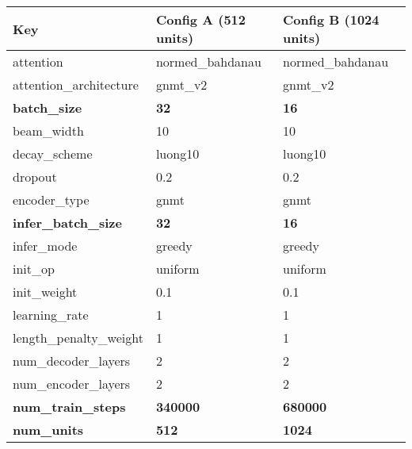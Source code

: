 \begin{table}[]
\small
\centering
\begin{tabular}{|l|l|l|}
\hline
\textbf{Key}                & \textbf{Config A (512 units)} & \textbf{Config B (1024 units)} \\ \hline
attention                   & normed\_bahdanau              & normed\_bahdanau               \\ \hline
attention\_architecture     & gnmt\_v2                      & gnmt\_v2                       \\ \hline
\textbf{batch\_size}        & \textbf{32}                   & \textbf{16}                    \\ \hline
beam\_width                 & 10                            & 10                             \\ \hline
decay\_scheme               & luong10                       & luong10                        \\ \hline
dropout                     & 0.2                           & 0.2                            \\ \hline
encoder\_type               & gnmt                          & gnmt                           \\ \hline
\textbf{infer\_batch\_size} & \textbf{32}                   & \textbf{16}                    \\ \hline
infer\_mode                 & greedy                        & greedy                         \\ \hline
init\_op                    & uniform                       & uniform                        \\ \hline
init\_weight                & 0.1                           & 0.1                            \\ \hline
learning\_rate              & 1                             & 1                              \\ \hline
length\_penalty\_weight     & 1                             & 1                              \\ \hline
num\_decoder\_layers        & 2                             & 2                              \\ \hline
num\_encoder\_layers        & 2                             & 2                              \\ \hline
\textbf{num\_train\_steps}         & \textbf{340000}                  & \textbf{680000} 
 \\ \hline
\textbf{num\_units}         & \textbf{512}                  & \textbf{1024} 

\end{tabular}
\end{table}
